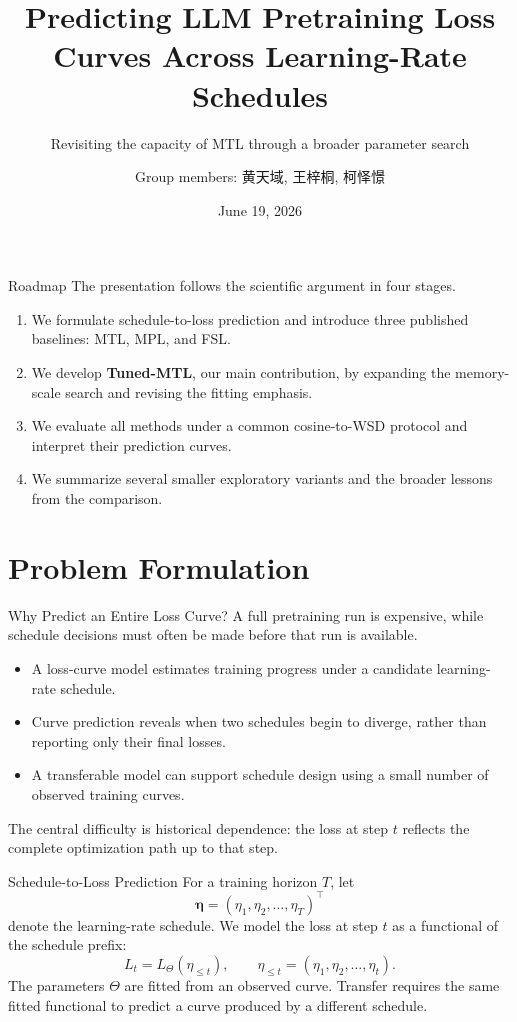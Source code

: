 \documentclass[aspectratio=169]{beamer}
\title{Predicting LLM Pretraining Loss Curves Across Learning-Rate Schedules}
\subtitle{Revisiting the capacity of MTL through a broader parameter search}
\author{Group members: 黄天域, 王梓桐, 柯怿憬}
\institute{Peking University}
\date{June 19, 2026}
\begin{document}
\begin{frame}
  \titlepage
\end{frame}

\begin{frame}{Roadmap}
  The presentation follows the scientific argument in four stages.
  \begin{enumerate}
    \item We formulate schedule-to-loss prediction and introduce three published baselines: MTL, MPL, and FSL.
    \item We develop \textbf{Tuned-MTL}, our main contribution, by expanding the memory-scale search and revising the fitting emphasis.
    \item We evaluate all methods under a common cosine-to-WSD protocol and interpret their prediction curves.
    \item We summarize several smaller exploratory variants and the broader lessons from the comparison.
  \end{enumerate}
\end{frame}

\section{Problem Formulation}

\begin{frame}{Why Predict an Entire Loss Curve?}
  A full pretraining run is expensive, while schedule decisions must often be made before that run is available.
  \begin{itemize}
    \item A loss-curve model estimates training progress under a candidate learning-rate schedule.
    \item Curve prediction reveals when two schedules begin to diverge, rather than reporting only their final losses.
    \item A transferable model can support schedule design using a small number of observed training curves.
  \end{itemize}
  \vspace{0.35em}
  The central difficulty is historical dependence: the loss at step \(t\) reflects the complete optimization path up to that step.
\end{frame}

\begin{frame}{Schedule-to-Loss Prediction}
  For a training horizon \(T\), let
  \[
    \bm{\eta}=(\eta_1,\eta_2,\ldots,\eta_T)^\top
  \]
  denote the learning-rate schedule. We model the loss at step \(t\) as a functional of the schedule prefix:
  \[
    L_t=L_{\Theta}(\eta_{\leq t}),
    \qquad
    \eta_{\leq t}=(\eta_1,\eta_2,\ldots,\eta_t).
  \]
  The parameters \(\Theta\) are fitted from an observed curve. Transfer requires the same fitted functional to predict a curve produced by a different schedule.
\end{frame}
\end{document}
